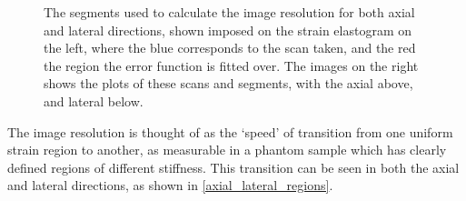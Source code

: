 \begin{figure}[t]
\begin{subfigure}{0.49\textwidth}
	\end{subfigure}
	\caption{The segments used to calculate the image resolution for both axial and lateral directions, shown imposed on the strain elastogram on the left, where the blue corresponds to the scan taken, and the red the region the error function is fitted over. The images on the right shows the plots of these scans and segments, with the axial above, and lateral below.}
	\label{axial_lateral_regions}	
\end{figure}

The image resolution is thought of as the `speed' of transition from one uniform strain region to another, as measurable in a phantom sample which has clearly defined regions of different stiffness. This transition can be seen in both the axial and lateral directions, as shown in \autoref{axial_lateral_regions}.


